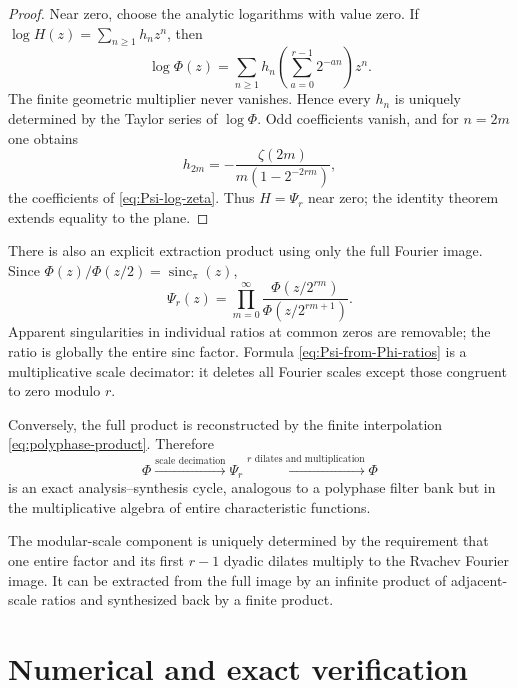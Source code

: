 \documentclass[11pt,oneside]{article}
\numberwithin{equation}{section}
\theoremstyle{definition}
\theoremstyle{remark}
\newcommand{\sincpi}{\operatorname{sinc}_{\pi}}
\begin{document}
\begin{proof}
Near zero, choose the analytic logarithms with value zero.  If
$\log H(z)=\sum_{n\ge1}h_nz^n$, then
\[
 \log\Phi(z)=\sum_{n\ge1}h_n
 \left(\sum_{a=0}^{r-1}2^{-an}\right)z^n.
\]
The finite geometric multiplier never vanishes.  Hence every $h_n$ is uniquely
determined by the Taylor series of $\log\Phi$.  Odd coefficients vanish, and
for $n=2m$ one obtains
\[
 h_{2m}=-\frac{\zeta(2m)}{m(1-2^{-2rm})},
\]
the coefficients of \eqref{eq:Psi-log-zeta}.  Thus $H=\Psi_r$ near zero;
the identity theorem extends equality to the plane.
\end{proof}

There is also an explicit extraction product using only the full Fourier image.
Since $\Phi(z)/\Phi(z/2)=\sincpi(z)$,
\begin{equation}
 \boxed{\displaystyle
 \Psi_r(z)=\prod_{m=0}^{\infty}
 \frac{\Phi(z/2^{rm})}{\Phi(z/2^{rm+1})}.}                \label{eq:Psi-from-Phi-ratios}
\end{equation}
Apparent singularities in individual ratios at common zeros are removable;
the ratio is globally the entire sinc factor.  Formula
\eqref{eq:Psi-from-Phi-ratios} is a multiplicative scale decimator: it deletes
all Fourier scales except those congruent to zero modulo $r$.

Conversely, the full product is reconstructed by the finite interpolation
\eqref{eq:polyphase-product}.  Therefore
\begin{equation}
 \Phi
 \xrightarrow{\text{scale decimation}}\Psi_r
 \xrightarrow{\text{$r$ dilates and multiplication}}\Phi                 \label{eq:analysis-synthesis-cycle}
\end{equation}
is an exact analysis--synthesis cycle, analogous to a polyphase filter bank but
in the multiplicative algebra of entire characteristic functions.

\begin{resultbox}
The modular-scale component is uniquely determined by the requirement that one
entire factor and its first $r-1$ dyadic dilates multiply to the Rvachev
Fourier image.  It can be extracted from the full image by an infinite product
of adjacent-scale ratios and synthesized back by a finite product.
\end{resultbox}

\section{Numerical and exact verification}
\label{sec:numerics}
\end{document}
